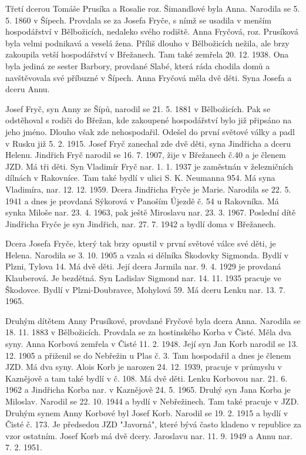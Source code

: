 \documentclass[../dejiny-rodu-prusiku.tex]{subfiles}
\begin{document}
Třetí dcerou Tomáše Prusíka a Rosalie roz. Šimandlové byla Anna. Narodila se 5. 5. 1860 v Šípech. Provdala se za Josefa Fryče, s nímž se usadila v menším hospodářství v Bělbožicích, nedaleko svého rodiště. Anna Fryčová, roz. Prusíková byla velmi podnikavá a veselá žena. Pří­liš dlouho v Bělbožicích nežila, ale brzy zakoupila vetší hospodářství v Břežanech. Tam také zemřela 20. 12. 1938. Ona byla jediná ze sester Barbory, provdané Slabé, která ráda chodila domů a navštěvovala své příbuzné v Šípech. Anna Fryčová měla dvě děti. Syna Josefa a dceru Annu.

Josef Fryč, syn Anny ze Šípů, narodil se 21. 5. 1881 v Bělbožicích. Pak se odstěhoval s rodiči do Břežan, kde zakoupené hospodářství bylo již připsáno na jeho jméno. Dlouho však zde nehospodařil. Odešel do první světové války a padl v Rusku již 5. 2. 1915. Josef Fryč zanechal zde dvě děti, syna Jindřicha a dceru Helenu. Jindřich Fryč narodil se 16. 7. 1907, žije v Břežanech č.40 a je členem JZD. Má tři děti. Syn Vladimír Fryč nar. 1. 1. 1937 je zaměstnán v železničních dílnách v Rakovníce. Tam také bydlí v ulici S. K. Neumanna 954. Má syna Vladimíra, nar. 12. 12. 1959. Dcera Jindřicha Fryče je Marie. Narodila se 22. 5. 1941 a dnes je provdaná Sýkorová v Panoším Újezdě č. 54 u Rakovníka. Má synka Miloše nar. 23. 4. 1963, pak ještě Miroslavu nar. 23. 3. 1967. Poslední dítě Jindřicha Fryče je syn Jindřich, nar. 27. 7. 1942 a bydlí doma v Břežanech.

Dcera Josefa Fryče, který tak brzy opustil v první světové válce své děti, je Helena. Narodila se 3. 10. 1905 a vzala si dělníka Škodovky Sigmonda. Bydlí v Plzni, Tylova 14. Má dvě děti. Její dcera Jarmila nar. 9. 4. 1929 je provdaná Klauberová. Je bezdětná. Syn Ladislav Sigmond nar. 14. 11. 1935 pracuje ve Škodovce. Bydlí v Plzni-Doubravce, Mohylová 59. Má dceru Lenku nar. 13. 7. 1965.

Druhým dítětem Anny Prusíkové, provdané Fryčové byla dcera Anna. Narodila se 18. 11. 1883 v Bělbožicích. Provdala se za hostinského Korba v Čisté. Měla dva syny. Anna  Korbová zemřela v Čisté 11. 2. 1948. Její syn Jan Korb narodil se 13. 12. 1905 a přiženil se do Nebřežin u Plas č. 3. Tam hospodařil a dnes je členem JZD. Má dva syny. Alois Korb je narozen 24. 12. 1939, pracuje v průmyslu v Kaznějově a tam také bydlí v č. 108. Má dvě děti. Lenku Korbovou nar. 21. 6. 1962 a Jindřicha Korba nar. v Kaznějově 24. 5. 1965. Druhý syn Jana Korba je Miloslav. Narodil se 22. 10. 1944 a bydlí v Nebřežinech. Tam také pracuje v JZD. Druhým synem Anny Korbové byl Josef Korb. Narodil se 19. 2. 1915 a bydlí v Čisté č. 173. Je předsedou JZD "Javorná", které bývá často kladeno v republice za vzor ostatním. Josef Korb má dvě dcery. Jaroslavu nar. 11. 9. 1949 a Annu nar. 7. 2. 1951.
\end{document}
